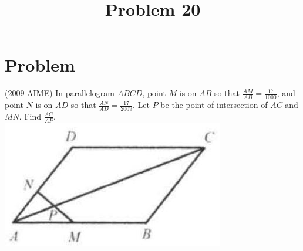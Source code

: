 \documentclass{article}
\title{Problem 20}
\date{}
\begin{document}
\maketitle

\section*{Problem}
(2009 AIME) In parallelogram \(A B C D\), point \(M\) is on \(A B\) so that \(\frac{A M}{A B}=\frac{17}{1000}\), and point \(N\) is on \(A D\) so that \(\frac{A N}{A D}=\frac{17}{2009}\). Let \(P\) be the point of intersection of \(A C\) and \(M N\). Find \(\frac{A C}{A P}\).\\
\centering
\includegraphics[width=\textwidth]{images/130(2).jpg}
\end{document}
